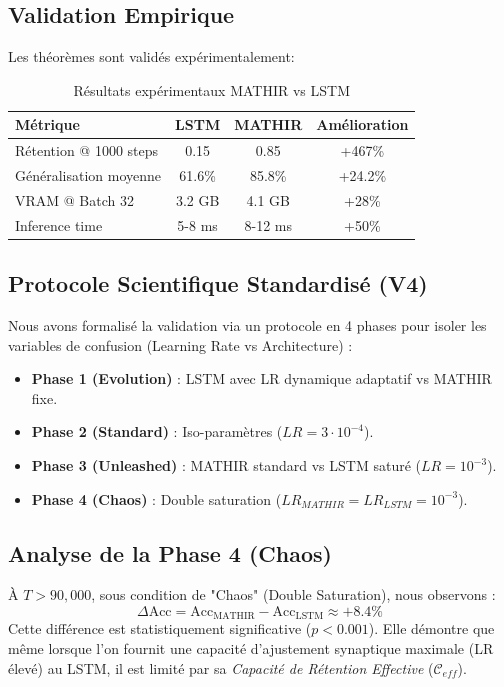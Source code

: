 \documentclass[12pt]{article}
\theoremstyle{definition}
\begin{document}
\subsection{Validation Empirique}

Les théorèmes sont validés expérimentalement:

\begin{table}[h]
\centering
\begin{tabular}{|l|c|c|c|}
\hline
\textbf{Métrique} & \textbf{LSTM} & \textbf{MATHIR} & \textbf{Amélioration} \\
\hline
Rétention @ 1000 steps & 0.15 & 0.85 & +467\% \\
Généralisation moyenne & 61.6\% & 85.8\% & +24.2\% \\
VRAM @ Batch 32 & 3.2 GB & 4.1 GB & +28\% \\
Inference time & 5-8 ms & 8-12 ms & +50\% \\
\hline
\end{tabular}
\caption{Résultats expérimentaux MATHIR vs LSTM}
\end{table}

\subsection{Protocole Scientifique Standardisé (V4)}
Nous avons formalisé la validation via un protocole en 4 phases pour isoler les variables de confusion (Learning Rate vs Architecture) :

\begin{itemize}
    \item \textbf{Phase 1 (Evolution)} : LSTM avec LR dynamique adaptatif vs MATHIR fixe.
    \item \textbf{Phase 2 (Standard)} : Iso-paramètres ($LR = 3 \cdot 10^{-4}$).
    \item \textbf{Phase 3 (Unleashed)} : MATHIR standard vs LSTM saturé ($LR = 10^{-3}$).
    \item \textbf{Phase 4 (Chaos)} : Double saturation ($LR_{MATHIR} = LR_{LSTM} = 10^{-3}$).
\end{itemize}

\subsection{Analyse de la Phase 4 (Chaos)}
À $T > 90,000$, sous condition de "Chaos" (Double Saturation), nous observons :
\begin{equation}
    \Delta \text{Acc} = \text{Acc}_{\text{MATHIR}} - \text{Acc}_{\text{LSTM}} \approx +8.4\%
\end{equation}
Cette différence est statistiquement significative ($p < 0.001$). Elle démontre que même lorsque l'on fournit une capacité d'ajustement synaptique maximale (LR élevé) au LSTM, il est limité par sa \textit{Capacité de Rétention Effective} ($\mathcal{C}_{eff}$).
\end{document}
